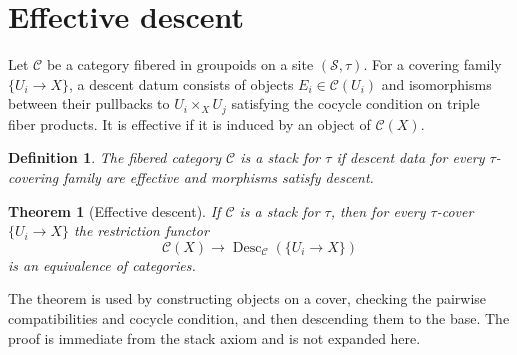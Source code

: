 \documentclass{article}
\newtheorem{theorem}{Theorem}
\newtheorem{definition}{Definition}
\begin{document}
\section{Effective descent}

Let $\mathcal{C}$ be a category fibered in groupoids on a site $(\mathcal{S},\tau)$.
For a covering family $\{U_i\to X\}$, a descent datum consists of objects
$E_i\in\mathcal{C}(U_i)$ and isomorphisms between their pullbacks to
$U_i\times_X U_j$ satisfying the cocycle condition on triple fiber products.
It is effective if it is induced by an object of $\mathcal{C}(X)$.

\begin{definition}
The fibered category $\mathcal{C}$ is a stack for $\tau$ if descent data for every
$\tau$-covering family are effective and morphisms satisfy descent.
\end{definition}

\begin{theorem}[Effective descent]\label{th:effective-descent}
If $\mathcal{C}$ is a stack for $\tau$, then for every $\tau$-cover
$\{U_i\to X\}$ the restriction functor
\[
  \mathcal{C}(X)\longrightarrow
  \operatorname{Desc}_{\mathcal{C}}(\{U_i\to X\})
\]
is an equivalence of categories.
\end{theorem}

The theorem is used by constructing objects on a cover, checking the pairwise
compatibilities and cocycle condition, and then descending them to the base.
The proof is immediate from the stack axiom and is not expanded here.
\end{document}
